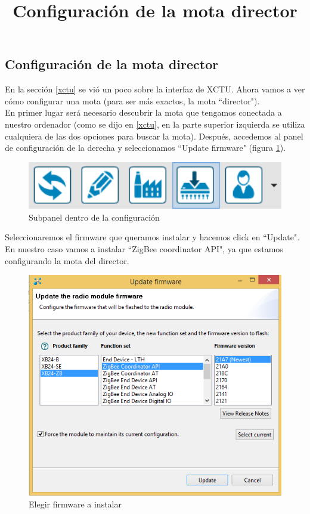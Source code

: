 \subsection{Configuración de la mota director}
\title{Configuración de la mota director}
\label{sec:configuracionmotadirector}

En la sección \ref{xctu} se vió un poco sobre la interfaz de XCTU. Ahora vamos a ver cómo
configurar una mota (para ser más exactos, la mota ``director").\\

En primer lugar será necesario descubrir la mota que tengamos conectada a nuestro ordenador
(como se dijo en \ref{xctu}, en la parte superior izquierda se utiliza cualquiera de las dos
opciones para buscar la mota). Después, accedemos al panel de configuración de la derecha y
seleccionamos ``Update firmware" (figura \ref{fig:configurar_mota_1}).

\begin{figure}[!htb]
\centering
\includegraphics[width=1\textwidth]{./imagenes/configurar_mota_1}
\caption{Subpanel dentro de la configuración} \label{fig:configurar_mota_1}
\end{figure}

Seleccionaremos el firmware que queramos instalar y hacemos click en ``Update".
En nuestro caso vamos a instalar ``ZigBee coordinator API", ya que estamos
configurando la mota del director.

\begin{figure}[!htb]
\centering
\includegraphics[width=1\textwidth]{./imagenes/configurar_mota_2}
\caption{Elegir firmware a instalar} \label{fig:configurar_mota_2}
\end{figure}

